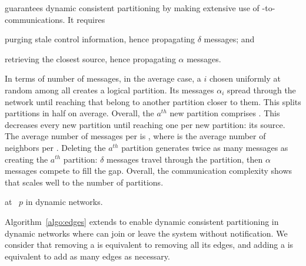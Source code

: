 \NAME guarantees dynamic consistent partitioning by making extensive
use of \process-to-\process communications. It requires
\begin{inparaenum}[(i)]
\item purging stale control information, hence propagating $\delta$
  messages; and
\item retrieving the closest source, hence propagating $\alpha$
  messages.
\end{inparaenum}
In terms of number of messages, in the average case, a \process $i$
chosen uniformly at random among all \processes creates a logical
partition. Its messages $\alpha_i$ spread through the network until
reaching \processes that belong to another partition closer to
them. This splits partitions in half on average. Overall, the $a^{th}$
new partition comprises  \processes. This decreases every new
partition until reaching one \process per new partition: its
source. The average number of messages per \process is
, where  is the average
number of neighbors per \process.
Deleting the $a^{th}$ partition generates twice as many messages as
creating the $a^{th}$ partition: $\delta$ messages travel through the
partition, then $\alpha$ messages compete to fill the gap.  Overall,
the communication complexity shows that \NAME scales well to the
number of partitions.

\begin{algorithm}
  
  \caption{\label{algo:edges}\NAME at \Process~$p$ in dynamic networks.}
\end{algorithm}

Algorithm~\ref{algo:edges} extends \NAME to enable dynamic consistent
partitioning in dynamic networks where \processes can join or leave
the system without notification. We consider that removing a \process
is equivalent to removing all its edges, and adding a \process is
equivalent to add as many edges as necessary.

